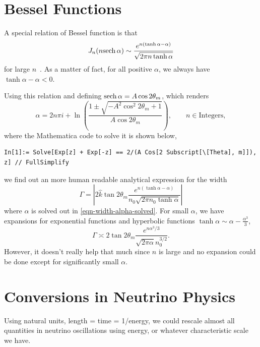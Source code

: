 \section{Bessel Functions}

A special relation of Bessel function is that
\begin{equation}
  J_n(n {\operatorname{sech}{\alpha}}) \sim \frac{ e^{n(\tanh\alpha - \alpha)} }{\sqrt{ 2\pi n \tanh \alpha } }
\end{equation}
for large $n$~\cite{Ploumistakis2009}. As a matter of fact, for all positive $\alpha$, we always have $\tanh \alpha - \alpha < 0$.

Using this relation and defining ${\operatorname{sech}{\alpha}} = A \cos 2\theta_m$, which renders
\begin{equation}
  \alpha = 2 n \pi i + \ln \left(  \frac{ 1 \pm \sqrt{ -A^2 \cos^2 2\theta_m + 1 } }{ A\cos 2\theta_m } \right),\qquad n\in \mathrm{Integers},
  \label{eqn-width-alpha-solved}
\end{equation}
where the Mathematica code to solve it is shown below,
\begin{verbatim}
In[1]:= Solve[Exp[z] + Exp[-z] == 2/(A Cos[2 Subscript[\[Theta], m]]), z] // FullSimplify
\end{verbatim}
we find out an more human readable analytical expression for the width
\begin{equation}
  \Gamma = \left\lvert 2 \hat k \tan 2\theta_m \frac{ e^{n ( \tanh \alpha - \alpha )} }{n_0 \sqrt{2\pi n_0 \tanh \alpha} } \right\rvert
\end{equation}
where $\alpha$ is solved out in \ref{eqn-width-alpha-solved}.
For small $\alpha$, we have expansions for exponential functions and hyperbolic functions $\tanh \alpha \sim \alpha - \frac{\alpha^3}{3}$,
\begin{equation}
  \Gamma \asymp 2\tan 2\theta_m \frac{ e^{n \alpha^3/3} }{\sqrt{2\pi \alpha} n_0^{3/2}  }.
\end{equation}
However, it doesn't really help that much since $n$ is large and no expansion could be done except for significantly small $\alpha$.





\section{Conversions in Neutrino Physics}

Using natural units, length = time = 1/energy, we could rescale almost all quantities in neutrino oscillations using energy, or whatever characteristic scale we have.

